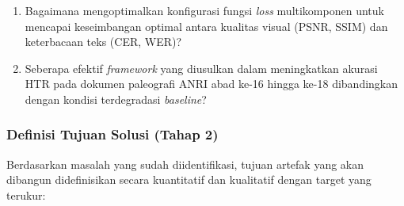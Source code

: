 \begin{enumerate}[label=\arabic*., leftmargin=*, nosep]
\begin{enumerate}[label=RQ\arabic*:, leftmargin=*, nosep]
              \item Bagaimana mengoptimalkan konfigurasi fungsi \textit{loss} multikomponen untuk mencapai keseimbangan optimal antara kualitas visual (PSNR, SSIM) dan keterbacaan teks (CER, WER)?

              \item Seberapa efektif \textit{framework} yang diusulkan dalam meningkatkan akurasi HTR pada dokumen paleografi ANRI abad ke-16 hingga ke-18 dibandingkan dengan kondisi terdegradasi \textit{baseline}?
          \end{enumerate}
\end{enumerate}

\subsubsection{Definisi Tujuan Solusi (Tahap 2)}
Berdasarkan masalah yang sudah diidentifikasi, tujuan artefak yang akan dibangun didefinisikan secara kuantitatif dan kualitatif dengan target yang terukur:
